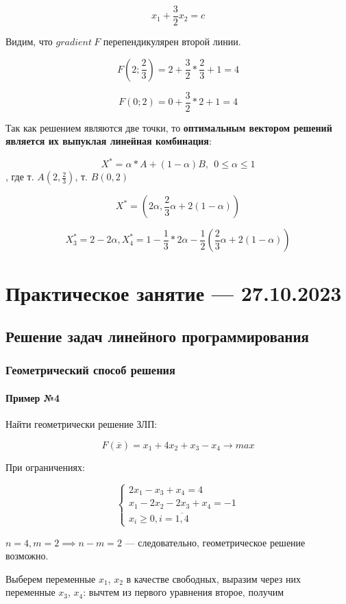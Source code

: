 \documentclass{article}
\begin{document}
$$x_1 + \frac{3}{2}x_2 = c$$

Видим, что $gradient \ F$ перепендикулярен второй линии.

$$
F(2; \frac{2}{3}) = 2 + \frac{3}{2} * \frac{2}{3} + 1 = 4
$$

$$
F(0; 2) = 0 + \frac{3}{2} * 2 + 1 = 4
$$

Так как решением являются две точки, то \textbf{оптимальным вектором решений является их выпуклая линейная комбинация}:

$$
X^{*} = \alpha * A + (1 - \alpha) B, \ \ 0 \le \alpha \le 1
$$, где т. $A(2, \frac{2}{3})$, т. $B(0, 2)$

$$X^{*} = (2\alpha, \frac{2}{3}\alpha + 2(1 - \alpha))$$

$$
X_3^{*} = 2 - 2\alpha, X_{4}^{*} = 1 - \frac{1}{3} * 2\alpha - \frac{1}{2}(\frac{2}{3}\alpha + 2(1 - \alpha))
$$

\section{Практическое занятие — 27.10.2023}

\subsection{Решение задач линейного программирования}

\subsubsection{Геометрический способ решения}

\paragraph{Пример №4}

Найти геометрически решение ЗЛП:

$$
F(\overline{x}) = x_1 + 4x_2 + x_3 - x_4 \to max
$$

При ограничениях:

$$
\begin{cases}
    2x_1 - x_3 + x_4 = 4 \\
    x_1 - 2x_2 - 2x_3 + x_4 = -1 \\
    x_i \ge 0, i = \overline{1, 4}
\end{cases}
$$

$n = 4, m = 2 \implies n - m = 2$ — следовательно, геометрическое решение возможно.

Выберем переменные $x_1$, $x_2$ в качестве свободных, выразим через них переменные $x_3$, $x_4$: вычтем из первого уравнения второе, получим  
\end{document}
